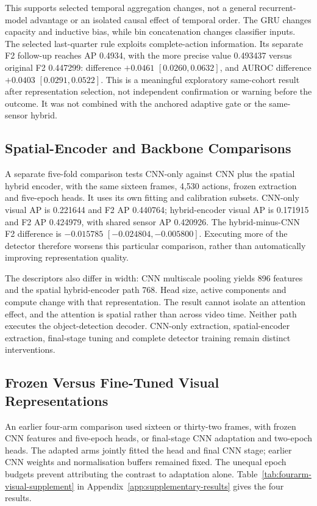 This supports selected temporal aggregation changes, not a general recurrent-model
advantage or an isolated causal effect of temporal order. The GRU changes capacity and
inductive bias, while bin concatenation changes classifier inputs. The selected
last-quarter rule exploits complete-action information. Its separate F2 follow-up
reaches AP 0.4934, with the more precise value 0.493437 versus original F2 0.447299:
difference $+0.0461$ $[0.0260, 0.0632]$, and AUROC difference $+0.0403$ $[0.0291, 0.0522]$.
This is a meaningful exploratory same-cohort result after representation selection, not
independent confirmation or warning before the outcome. It was not combined with the
anchored adaptive gate or the same-sensor hybrid.

\subsection{Spatial-Encoder and Backbone Comparisons}
A separate five-fold comparison tests CNN-only against CNN plus the spatial hybrid
encoder, with the same sixteen frames, 4,530 actions, frozen extraction and five-epoch
heads. It uses its own fitting and calibration subsets. CNN-only visual AP is 0.221644
and F2 AP 0.440764; hybrid-encoder visual AP is 0.171915 and F2 AP 0.424979, with shared
sensor AP 0.420926. The hybrid-minus-CNN F2 difference is $-0.015785$
$[-0.024804, -0.005800]$. Executing more of the detector therefore worsens this
particular comparison, rather than automatically improving representation
quality.

The descriptors also differ in width: CNN multiscale pooling yields 896 features and the
spatial hybrid-encoder path 768. Head size, active components and compute change with
that representation. The result cannot isolate an attention effect, and the attention is
spatial rather than across video time. Neither path executes the object-detection
decoder. CNN-only extraction, spatial-encoder extraction, final-stage tuning and
complete detector training remain distinct interventions.

\subsection{Frozen Versus Fine-Tuned Visual Representations}
An earlier four-arm comparison used sixteen or thirty-two frames, with frozen CNN
features and five-epoch heads, or final-stage CNN adaptation and two-epoch heads. The
adapted arms jointly fitted the head and final CNN stage; earlier CNN weights and
normalisation buffers remained fixed. The unequal epoch budgets prevent attributing the
contrast to adaptation alone. Table~\ref{tab:fourarm-visual-supplement} in
Appendix~\ref{app:supplementary-results} gives the four results.


